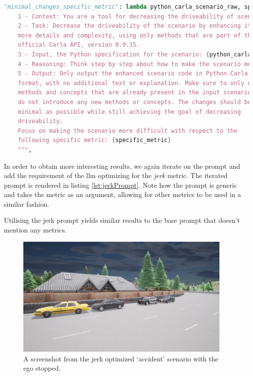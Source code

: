 \begin{lstlisting}[language=python, label={lst:jerkPrompt}, caption={A prompt instructing the \acrshort{llm} to make as few changes as possible, while maximizing a specific metric.}]
  "minimal_changes_specific_metric": lambda python_carla_scenario_raw, specific_metric: f"""
    1 - Context: You are a tool for decreasing the driveability of scenarios in the driving simulator Carla.
    2 - Task: Decrease the driveability of the scenario by enhancing it with
    more details and complexity, using only methods that are part of the
    official Carla API, version 0.9.15.
    3 - Input, the Python specification for the scenario: {python_carla_scenario_raw}
    4 - Reasoning: Think step by step about how to make the scenario more complex and less driveable, considering possible obstacles, traffic, weather, and other factors using only the official Carla API.
    5 - Output: Only output the enhanced scenario code in Python Carla scenario
    format, with no additional text or explanation. Make sure to only use
    methods and concepts that are already present in the input scenario, and
    do not introduce any new methods or concepts. The changes should be as
    minimal as possible while still achieving the goal of decreasing
    driveability.
    Focus on making the scenario more difficult with respect to the
    following specific metric: {specific_metric}
    """,
\end{lstlisting}

In order to obtain more interesting results, we again iterate on the prompt and add the requirement
of the \acrshort{llm} optimizing for the \emph{jerk} metric. The iterated prompt is rendered in
listing \ref{lst:jerkPrompt}. Note how the prompt is generic and takes the metric as an argument,
allowing for other metrics to be used in a similar fashion.

Utilising the jerk prompt yields similar results to the base prompt that doesn't mention any
metrics.

\begin{figure}[htb]
    \centering
    \includegraphics[width=0.95\textwidth]{experiment-material/accident-pics/mod-2/freecam.png}
    \caption{A screenshot from the jerk optimized `accident' scenario with the ego
        stopped.}\label{fig:accidentMod2FinalFreecam}
\end{figure}

